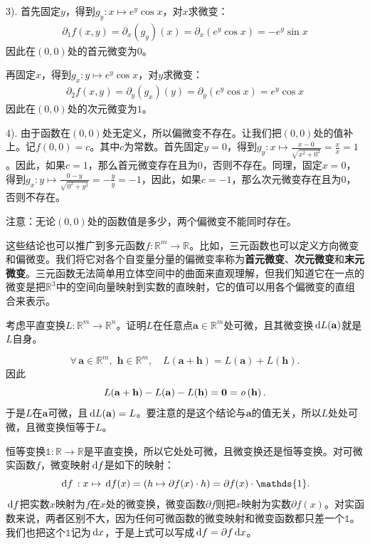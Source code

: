 \documentclass[12pt,UTF8,fontset=none]{ctexbook}
\begin{document}
\begin{so}
    3). 首先固定$y$，得到$g_y: x\mapsto e^y\cos{x} $，对$x$求微变：
    \begin{align*}
        \partial_{1} f (x, y) = \partial_x (g_y) (x) = \partial_x \left( e^y\cos{x} \right) = -e^y\sin{x}
    \end{align*}
    因此在$(0,0)$处的首元微变为$0$。

    再固定$x$，得到$g_x: y\mapsto e^y\cos{x} $，对$y$求微变：
    \begin{align*}
        \partial_{2} f (x, y) = \partial_y (g_x) (y)  = \partial_y \left( e^y\cos{x} \right) = e^y\cos{x}
    \end{align*}
    因此在$(0,0)$处的次元微变为$1$。
    
    4). 由于函数在$(0,0)$处无定义，所以偏微变不存在。让我们把$(0,0)$处的值补上。记$f(0,0)=c$。其中$c$为常数。首先固定$y=0$，得到$g_y: x\mapsto \displaystyle\frac{x - 0}{\sqrt{x^2 + 0^2}} = \frac{x}{x} = 1 $。因此，如果$c=1$，那么首元微变存在且为$0$，否则不存在。同理，固定$x=0$，得到$g_x: y\mapsto \displaystyle\frac{0 - y}{\sqrt{0^2 + y^2}} = -\frac{y}{y} = -1$，因此，如果$c=-1$，那么次元微变存在且为$0$，否则不存在。

    注意：无论$(0,0)$处的函数值是多少，两个偏微变不能同时存在。
\end{so}

这些结论也可以推广到多元函数$f: \mathbb{R}^m\rightarrow \mathbb{R}$。比如，三元函数也可以定义方向微变和偏微变。我们将它对各个自变量分量的偏微变率称为\textbf{首元微变}、\textbf{次元微变}和\textbf{末元微变}。三元函数无法简单用立体空间中的曲面来直观理解，但我们知道它在一点的微变是把$\mathbb{R}^3$中的空间向量映射到实数的直映射，它的值可以用各个偏微变的直组合来表示。

\begin{et}
    考虑平直变换$L:\mathbb{R}^m\rightarrow\mathbb{R}^n$。证明$L$在任意点$\mathbf{a}\in\mathbb{R}^m$处可微，且其微变换$\,\mathrm{d} L(\mathbf{a})$就是$L$自身。
\end{et}

\begin{so}
    $$\forall\, \mathbf{a}\in\mathbb{R}^m,\,\,\mathbf{h}\in\mathbb{R}^m , \quad L(\mathbf{a}+\mathbf{h}) = L(\mathbf{a}) + L(\mathbf{h}). $$
    因此
    $$ L(\mathbf{a}+\mathbf{h}) - L(\mathbf{a}) - L(\mathbf{h}) = \mathbf{0} = \mathit{o}\left(\mathbf{h}\right). $$
    于是$L$在$\mathbf{a}$可微，且$\,\mathrm{d} L(\mathbf{a})=L$。要注意的是这个结论与$\mathbf{a}$的值无关，所以$L$处处可微，且微变换恒等于$L$。
\end{so}

恒等变换$\mathds{1}:\mathbb{R}\to\mathbb{R}$是平直变换，所以它处处可微，且微变换还是恒等变换。对可微实函数$f$，微变映射$\,\mathrm{d} f$是如下的映射：
$$ \diff f \,: x \mapsto \diff f(x) = (h\mapsto \partial f(x) \cdot h) = \partial f(x)\cdot \mathds{1}. $$
$\,\mathrm{d} f$把实数$x$映射为$f$在$x$处的微变换，微变函数$\partial f$则把$x$映射为实数$\partial f(x)$。对实函数来说，两者区别不大，因为任何可微函数的微变映射和微变函数都只差一个$\mathds{1}$。我们也把这个$\mathds{1}$记为$\,\mathrm{d}x$，于是上式可以写成$\,\mathrm{d} f = \partial f \,\mathrm{d}x$。
\end{document}
